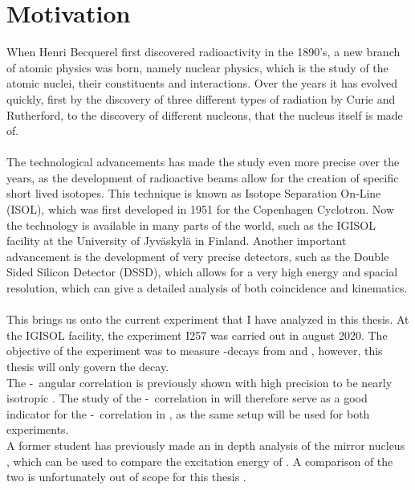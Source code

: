 \section{Motivation}
When Henri Becquerel first discovered radioactivity in the 1890's, a new branch of atomic physics was born, namely nuclear physics, which is the study of the atomic nuclei, their constituents and interactions. 
Over the years it has evolved quickly, first by the discovery of three different types of radiation by Curie and Rutherford, to the discovery of different nucleons, that the nucleus itself is made of.  \\
\\
The technological advancements has made the study even more precise over the years, as the development of radioactive beams allow for the creation of specific short lived isotopes.
This technique is known as Isotope Separation On-Line (ISOL), which was first developed in 1951 for the Copenhagen Cyclotron. 
Now the technology is available in many parts of the world, such as the IGISOL facility at the University of Jyväskylä in Finland. 
Another important advancement is the development of very precise detectors, such as the Double Sided Silicon Detector (DSSD), which allows for a very high energy and spacial resolution, which can give a detailed analysis of both coincidence and kinematics. \\
\\
This brings us onto the current experiment that I have analyzed in this thesis. At the IGISOL facility, the experiment I257 was carried out in august 2020. The objective of the experiment was to measure \be-decays from \li and , however, this thesis will only govern the \li decay. \\
 The \be-\al\ angular correlation is previously shown with high precision to be nearly isotropic \cite{isotrop}. The study of the \be-\al\ correlation in \li will therefore serve as a good indicator for the \be-\al\ correlation in , as the same setup will be used for both experiments. \\
A former student has previously made an in depth analysis of the mirror nucleus , which can be used to compare the excitation energy of \ber. A comparison of the two is unfortunately out of scope for this thesis .


